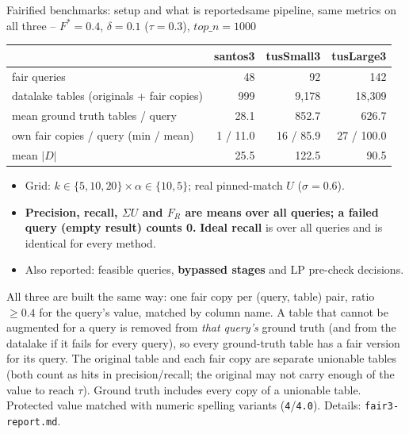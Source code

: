 \documentclass[aspectratio=169,10pt]{beamer}
\begin{document}
\begin{frame}{Fairified benchmarks: setup and what is reported}{same pipeline, same metrics on all three -- $F^*{=}0.4$, $\delta{=}0.1$ ($\tau{=}0.3$), $top\_n{=}1000$}
\small
\begin{center}
\setlength{\tabcolsep}{5pt}
\begin{tabular}{lrrr}
\toprule
 & santos3 & tusSmall3 & tusLarge3 \\
\midrule
fair queries & 48 & 92 & 142 \\
datalake tables (originals + fair copies) & 999 & 9,178 & 18,309 \\
mean ground truth tables / query & 28.1 & 852.7 & 626.7 \\
own fair copies / query (min / mean) & 1 / 11.0 & 16 / 85.9 & 27 / 100.0 \\
mean $|D|$ & 25.5 & 122.5 & 90.5 \\
\bottomrule
\end{tabular}
\end{center}
\vspace{4pt}
\begin{itemize}\setlength\itemsep{2pt}
\item Grid: $k\in\{5,10,20\}\times\alpha\in\{10,5\}$; real pinned-match $U$ ($\sigma{=}0.6$).
\item \textbf{Precision, recall, $\Sigma U$ and $F_R$ are means over all queries; a failed query (empty result) counts 0.} \textbf{Ideal recall} is over all queries and is identical for every method.
\item Also reported: feasible queries, \textbf{bypassed stages} and LP pre-check decisions.
\end{itemize}
{\footnotesize\color{Muted} All three are built the same way: one fair copy per (query, table) pair, ratio $\ge0.4$ for the query's value, matched by column name. A table that cannot be augmented for a query is removed from \emph{that query's} ground truth (and from the datalake if it fails for every query), so every ground-truth table has a fair version for its query. The original table and each fair copy are separate unionable tables (both count as hits in precision/recall; the original may not carry enough of the value to reach $\tau$). Ground truth includes every copy of a unionable table. Protected value matched with numeric spelling variants (\texttt{4}/\texttt{4.0}). Details: \texttt{fair3-report.md}.}
\end{frame}
\end{document}
